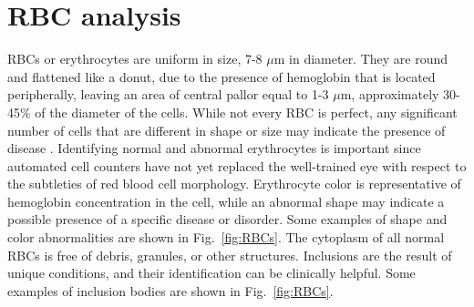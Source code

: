 {	\chapter{RBC analysis}
	RBCs or erythrocytes are uniform in size, 7-8 $\mu$m in diameter. They are round and flattened like a donut, due to the presence of hemoglobin that is located peripherally, leaving an area of central pallor equal to 1-3 $\mu$m, approximately 30-45\% of the diameter of the cells. While not every RBC is perfect, any significant number of cells that are different in shape or size may indicate the presence of disease \cite{Erhabor}. Identifying normal and abnormal erythrocytes is important since automated cell counters have not yet replaced the well-trained eye with respect to the subtleties of red blood cell morphology. Erythrocyte color is representative of hemoglobin concentration in the cell, while an abnormal shape may indicate a possible presence of a specific disease or disorder. Some examples of shape and color abnormalities are shown in Fig.~\ref{fig:RBCs}. The cytoplasm of all normal RBCs is free of debris, granules, or other structures. Inclusions are the result of unique conditions, and their identification can be clinically helpful. Some examples of inclusion bodies are shown in Fig.~\ref{fig:RBCs}.
	
}
